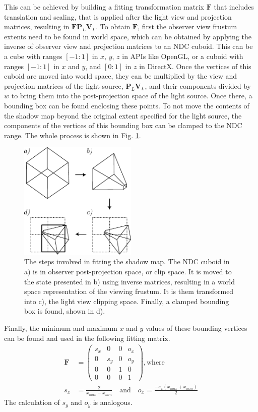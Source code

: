 This can be achieved by building a fitting transformation matrix \(\mathbf{F}\) that includes translation and scaling, that is applied after the light view and projection matrices, resulting in \(\mathbf{F}\mathbf{P}_L\mathbf{V}_L\). To obtain \(\mathbf{F}\), first the observer view frustum extents need to be found in world space, which can be obtained by applying the inverse of observer view and projection matrices to an NDC cuboid. This can be a cube with ranges \([-1:1]\) in \(x\), \(y\), \(z\) in APIs like OpenGL, or a cuboid with ranges \([-1:1]\) in \(x\) and \(y\), and \([0:1]\) in \(z\) in DirectX. Once the vertices of this cuboid are moved into world space, they can be multiplied by the view and projection matrices of the light source, \(\mathbf{P}_L\mathbf{V}_L\), and their components divided by \(w\) to bring them into the post-projection space of the light source. Once there, a bounding box can be found enclosing these points. To not move the contents of the shadow map beyond the original extent specified for the light source, the components of the vertices of this bounding box can be clamped to the NDC range. The whole process is shown in Fig. \ref{fig:shadow_map_fitting}.
\begin{figure}[hb]
    \centering
	\includegraphics[width=0.5\textwidth]{./graf/shadow_map_focusing.pdf}
	\caption{The steps involved in fitting the shadow map. The NDC cuboid in a) is in observer post-projection space, or clip space. It is moved to the state presented in b) using inverse matrices, resulting in a world space representation of the viewing frustum. It is them transformed into c), the light view clipping space. Finally, a clamped bounding box is found, shown in d).}
	\label{fig:shadow_map_fitting}
\end{figure}
Finally, the minimum and maximum \(x\) and \(y\) values of these bounding vertices can be found and used in the following fitting matrix.
\begin{align}
	\mathbf{F} &= 
	\begin{pmatrix}
		s_x & 0 & 0 & o_x\\
		0 & s_y & 0 & o_y\\
		0 & 0 & 1 & 0\\
		0 & 0 & 0 & 1
	\end{pmatrix}, \text{where}\\[10pt]
	s_x &= \frac{2}{x_{max} - x_{min}} \quad\text{and}\quad o_x = \frac{-s_x(x_{max} + x_{min})}{2}
\end{align}
The calculation of \(s_y\) and \(o_y\) is analogous.

